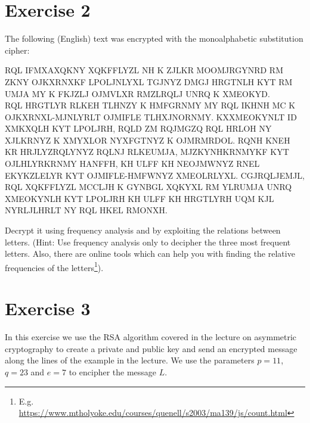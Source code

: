 \documentclass[12pt]{article}
\begin{document}
	\section*{Exercise 2}
	\label{sec:monoalphabetic}
	The following (English) text was encrypted with the monoalphabetic substitution cipher:
	\par
	RQL IFMXAXQKNY XQKFFLYZL NH K ZJLKR MOOMJRGYNRD RM ZKNY OJKXRNXKF LPOLJNLYXL TGJNYZ DMGJ HRGTNLH KYT RM UMJA MY K FKJZLJ OJMVLXR RMZLRQLJ UNRQ K XMEOKYD.\\
	RQL HRGTLYR RLKEH TLHNZY K HMFGRNMY MY RQL IKHNH MC K OJKXRNXL-MJNLYRLT OJMIFLE TLHXJNORNMY. KXXMEOKYNLT ID XMKXQLH KYT LPOLJRH, RQLD ZM RQJMGZQ RQL HRLOH NY XJLKRNYZ K XMYXLOR NYXFGTNYZ K OJMRMRDOL. RQNH KNEH KR HRJLYZRQLYNYZ RQLNJ RLKEUMJA, MJZKYNHKRNMYKF KYT OJLHLYRKRNMY HANFFH, KH ULFF KH NEOJMWNYZ RNEL EKYKZLELYR KYT OJMIFLE-HMFWNYZ XMEOLRLYXL. CGJRQLJEMJL, RQL XQKFFLYZL MCCLJH K GYNBGL XQKYXL RM YLRUMJA UNRQ XMEOKYNLH KYT LPOLJRH KH ULFF KH HRGTLYRH UQM KJL NYRLJLHRLT NY RQL HKEL RMONXH.\par
	
	
	
	Decrypt it using frequency analysis and by exploiting the relations between letters. (Hint: Use frequency analysis only to decipher the three most frequent letters. Also, there are online tools which can help you with finding the relative frequencies of the letters\footnote{E.g. \url{https://www.mtholyoke.edu/courses/quenell/s2003/ma139/js/count.html}}).
	
	\newpage
	
	\section*{Exercise 3}
	\label{sec:RSA}
	In this exercise we use the RSA algorithm covered in the lecture on asymmetric cryptography to create a private and public key and send an encrypted message along the lines of the example in the lecture. We use the parameters $p = 11$, $q = 23$ and $e = 7$ to encipher the message $L$.
	
\end{document}
